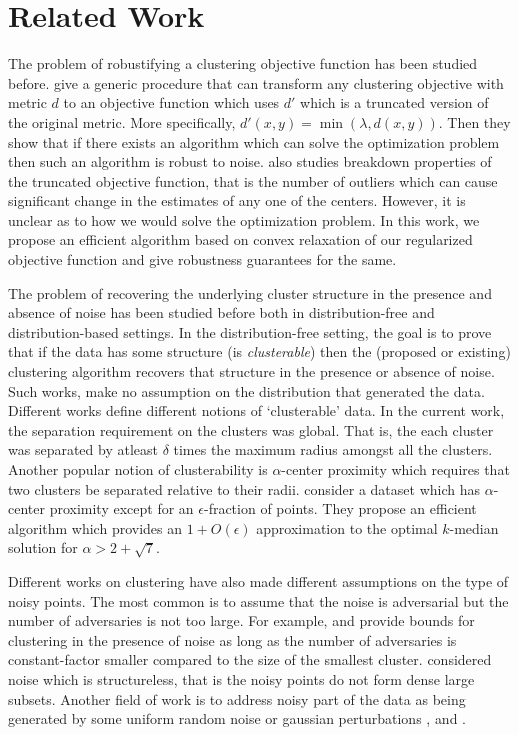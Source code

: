 \documentclass[12pt]{article}
\begin{document}
\section{Related Work}
The problem of robustifying a clustering objective function has been studied before. \cite{ben2014clustering} give a generic procedure that can transform any clustering objective with metric $d$ to an objective function which uses $d'$ which is a truncated version of the original metric. More specifically, $d'(x, y) = \min (\lambda,   d(x,y)).$ Then they show that if there exists an algorithm which can solve the optimization problem then such an algorithm is robust to noise. \cite{georgogiannis2016robust}  also studies breakdown properties of the truncated objective function, that is the number of outliers which can cause significant change in the estimates of any one of the centers. However, it is unclear as to how we would solve the optimization problem. In this work, we propose an efficient algorithm based on convex relaxation of our regularized objective function and give robustness guarantees for the same. 

The problem of recovering the underlying cluster structure in the presence and absence of noise has been studied before both in distribution-free and distribution-based settings. In the distribution-free setting, the goal is to prove that if the data has some structure (is {\em clusterable}) then the (proposed or existing) clustering algorithm recovers that structure in the presence or absence of noise. Such works, make no assumption on the distribution that generated the data. Different works define different notions of `clusterable' data. In the current work, the separation requirement on the clusters was global. That is, the each cluster was separated by atleast $\delta$ times the maximum radius amongst all the clusters. Another popular notion of clusterability is $\alpha$-center proximity \cite{awasthi2012center} which requires that two clusters be separated relative to their radii. \cite{balcan2012clustering} consider a dataset which has $\alpha$-center proximity except for an $\epsilon$-fraction of points. They propose an efficient algorithm which provides an $1+O(\epsilon)$ approximation to the optimal $k$-median solution for $\alpha > 2 + \sqrt{7}$.


Different works on clustering have also made different assumptions on the type of noisy points. The most common is to assume that the noise is adversarial but the number of adversaries is not too large. For example,  and \cite{balcan2008discriminative} provide bounds for clustering in the presence of noise as long as the number of adversaries is constant-factor smaller compared to the size of the smallest cluster. \cite{kushagra2016finding} considered noise which is structureless, that is the noisy points do not form dense large subsets. Another field of work is to address noisy part of the data as being generated by some uniform random noise or gaussian perturbations \cite{cuesta1997trimmed}, \cite{garcia2008general} and \cite{dave1993robust}.
\end{document}
